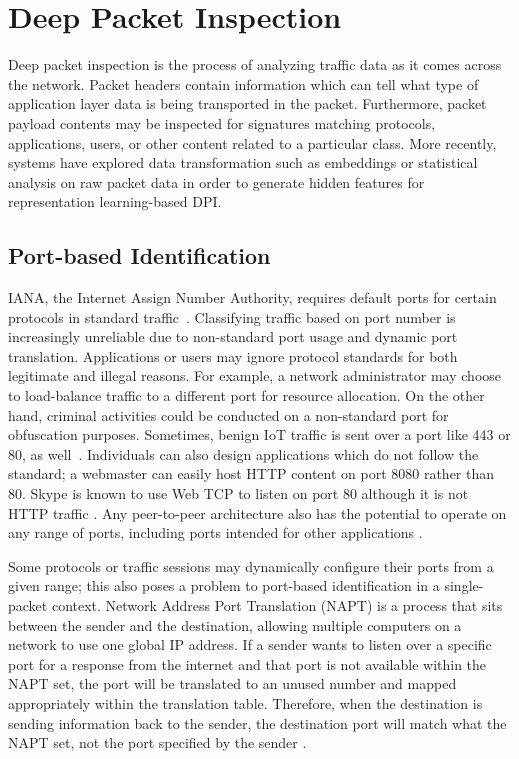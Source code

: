 \section{Deep Packet Inspection}
Deep packet inspection is the process of analyzing traffic data as it comes across the network. Packet headers contain information which can tell what type of application layer data is being transported in the packet. Furthermore, packet payload contents may be inspected for signatures matching protocols, applications, users, or other content related to a particular class. More recently, systems have explored data transformation such as embeddings or statistical analysis on raw packet data in order to generate hidden features for representation learning-based DPI.

\subsection{Port-based Identification}
IANA, the Internet Assign Number Authority, requires default ports for certain protocols in standard traffic~\cite{IANA}. Classifying traffic based on port number is increasingly unreliable due to non-standard port usage and dynamic port translation. Applications or users may ignore protocol standards for both legitimate and illegal reasons. For example, a network administrator may choose to load-balance traffic to a different port for resource allocation. On the other hand, criminal activities could be conducted on a non-standard port for obfuscation purposes. Sometimes, benign IoT traffic is sent over a port like 443 or 80, as well~\cite{charyyev2020iot}. Individuals can also design applications which do not follow the standard; a webmaster can easily host HTTP content on port 8080 rather than 80. Skype is known to use Web TCP to listen on port 80 although it is not HTTP traffic \cite{Freire}. Any peer-to-peer architecture also has the potential to operate on any range of ports, including ports intended for other applications \cite{Karagiannis}.

Some protocols or traffic sessions may dynamically configure their ports from a given range; this also poses a problem to port-based identification in a single-packet context. Network Address Port Translation (NAPT) is a process that sits between the sender and the destination, allowing multiple computers on a network to use one global IP address. If a sender wants to listen over a specific port for a response from the internet and that port is not available within the NAPT set, the port will be translated to an unused number and mapped appropriately within the translation table. Therefore, when the destination is sending information back to the sender, the destination port will match what the NAPT set, not the port specified by the sender \cite{Smith}.

